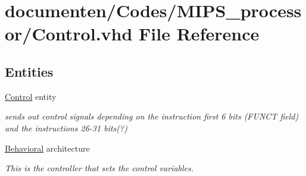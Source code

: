 \hypertarget{_control_8vhd}{\section{documenten/\-Codes/\-M\-I\-P\-S\-\_\-processor/\-Control.vhd File Reference}
\label{_control_8vhd}
}
\subsection*{Entities}
\begin{DoxyCompactItemize}
\item 
\hyperlink{class_control}{Control} entity
\begin{DoxyCompactList}\small\item\em sends out control signals depending on the instruction first 6 bits (F\-U\-N\-C\-T field) and the instructions 26-\/31 bits(?) \end{DoxyCompactList}\item 
\hyperlink{class_control_1_1_behavioral}{Behavioral} architecture
\begin{DoxyCompactList}\small\item\em This is the controller that sets the control variables. \end{DoxyCompactList}\end{DoxyCompactItemize}
